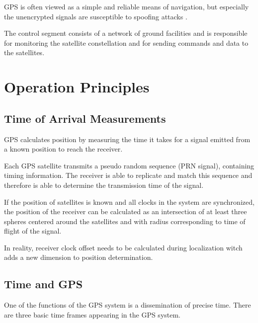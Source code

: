 GPS is often viewed as a simple and reliable means of navigation,
but especially the unencrypted signals are susceptible to spoofing attacks \cite{tippenhauer11}.


The control segment consists of a network of ground facilities and is responsible for
monitoring the satellite constellation and for sending commands and data to the satellites.



\section{Operation Principles}

\subsection{Time of Arrival Measurements}

GPS calculates position by measuring the time it takes for a signal
emitted from a known position to reach the receiver.

Each GPS satellite transmits a pseudo random sequence (PRN signal),
containing timing information.
The receiver is able to replicate and match this sequence and therefore
is able to determine the transmission time of the signal.

If the position of satellites is known and all clocks in the system are
synchronized, the position of the receiver
can be calculated as an intersection of at least three spheres centered around the satellites
and with radius corresponding to time of flight of the signal.

In reality, receiver clock offset needs to be calculated
during localization witch adds a new dimension to position determination.

\subsection{Time and GPS}

One of the functions of the GPS system is a dissemination of precise time.
There are three basic time frames appearing in the GPS system.

